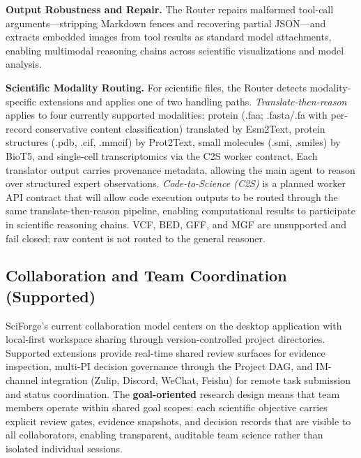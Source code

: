 \documentclass[sn-basic,Numbered,pdflatex]{sn-jnl}
\begin{document}
\textbf{Output Robustness and Repair.} The Router repairs malformed tool-call arguments---stripping Markdown fences and recovering partial JSON---and extracts embedded images from tool results as standard model attachments, enabling multimodal reasoning chains across scientific visualizations and model analysis.

\textbf{Scientific Modality Routing.} For scientific files, the Router detects modality-specific extensions and applies one of two handling paths. \emph{Translate-then-reason} applies to four currently supported modalities: protein (.faa; .fasta/.fa with per-record conservative content classification) translated by Esm2Text, protein structures (.pdb, .cif, .mmcif) by Prot2Text, small molecules (.smi, .smiles) by BioT5, and single-cell transcriptomics via the C2S worker contract. Each translator output carries provenance metadata, allowing the main agent to reason over structured expert observations. \emph{Code-to-Science (C2S)} is a planned worker API contract that will allow code execution outputs to be routed through the same translate-then-reason pipeline, enabling computational results to participate in scientific reasoning chains. VCF, BED, GFF, and MGF are unsupported and fail closed; raw content is not routed to the general reasoner.


\subsection{Collaboration and Team Coordination (Supported)}
SciForge's current collaboration model centers on the desktop application with local-first workspace sharing through version-controlled project directories. Supported extensions provide real-time shared review surfaces for evidence inspection, multi-PI decision governance through the Project DAG, and IM-channel integration (Zulip, Discord, WeChat, Feishu) for remote task submission and status coordination. The \textbf{goal-oriented} research design means that team members operate within shared goal scopes: each scientific objective carries explicit review gates, evidence snapshots, and decision records that are visible to all collaborators, enabling transparent, auditable team science rather than isolated individual sessions.
\end{document}
